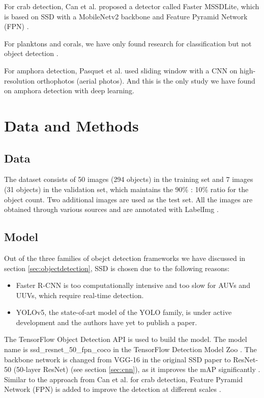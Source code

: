 \documentclass[a4paper, 11pt, oneside]{article}
\begin{document}
  For crab detection, Can et al. \cite{cao2020real} proposed a detector called Faster MSSDLite, which is based on SSD with
  a MobileNetv2 backbone and Feature Pyramid Network (FPN) \cite{lin2017feature}.

  For planktons and corals, we have only found research for classification but not object detection
  \cite{qin2015underwater, moniruzzaman2017deep}.

  For amphora detection, Pasquet et al. \cite{mccarthy20193d, pasquet2017amphora} used sliding window with a CNN on
  high-resolution orthophotos (aerial photos). And this is the only study we have found on amphora detection with deep
  learning.

  \section{Data and Methods}

  \subsection{Data}

  The dataset consists of 50 images (294 objects) in the training set and 7 images (31 objects) in the validation set,
  which maintains the 90\% : 10\% ratio for the object count. Two additional images are used as the test set. All the
  images are obtained through various sources
  \cite{googleimages, scuba, itinari, whoi, phoenician, auscape, hakai, groplan, ionian, sanisera} and are annotated
  with LabelImg \cite{labelimg}.

  \subsection{Model}

  Out of the three families of obejct detection frameworks we have discussed in section \ref{sec:objectdetection}, SSD is
  chosen due to the following reasons:

  \begin{itemize}
    \item Faster R-CNN is too computationally intensive and too slow for AUVs and UUVs, which require real-time detection.
    \item YOLOv5, the state-of-art model of the YOLO family, is under active development and the authors have yet to
    publish a paper.
  \end{itemize}

  The TensorFlow Object Detection API \cite{huang2017speed, tfobjectdetection} is used to build the model. The model name
  is ssd\_resnet\_50\_fpn\_coco in the TensorFlow Detection Model Zoo \cite{tfobjectdetectionmodelzoo}. The backbone
  network is changed from VGG-16 in the original SSD paper to ResNet-50 (50-layer ResNet)
  (see section \ref{sec:cnn}), as it improves the mAP significantly \cite{he2016deep}. Similar to the approach
  from Can et al. \cite{cao2020real} for crab detection, Feature Pyramid Network (FPN) is added to improve the detection at
  different scales \cite{lin2017feature}.
\end{document}
